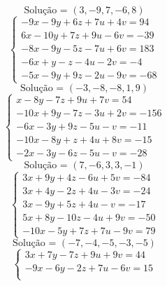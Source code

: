 \documentclass[12pt,oneside,a4paper,fleqn]{article}
\begin{document}
\begin{multicols*}{2}
\begin{equation*}
\end{equation*}
\begin{equation*}
\text{Solução = }\left(3,-9,7,-6,8\right)
\end{equation*}
\vspace{\baselineskip}
\begin{equation*}
\begin{cases}
-9x-9y+6z+7u+4v=94 \\
6x-10y+7z+9u-6v=-39 \\
-8x-9y-5z-7u+6v=183 \\
-6x+y-z-4u-2v=-4 \\
-5x-9y+9z-2u-9v=-68
\end{cases}
\end{equation*}
\begin{equation*}
\text{Solução = }\left(-3,-8,-8,1,9\right)
\end{equation*}
\vspace{\baselineskip}
\begin{equation*}
\begin{cases}
x-8y-7z+9u+7v=54 \\
-10x+9y-7z-3u+2v=-156 \\
-6x-3y+9z-5u-v=-11 \\
-10x-8y+z+4u+8v=-15 \\
-2x-3y-6z-5u-v=-28
\end{cases}
\end{equation*}
\begin{equation*}
\text{Solução = }\left(7,-6,3,3,-1\right)
\end{equation*}
\vspace{\baselineskip}
\begin{equation*}
\begin{cases}
3x+9y+4z-6u+5v=-84 \\
3x+4y-2z+4u-3v=-24 \\
3x-9y+5z+4u-v=-17 \\
5x+8y-10z-4u+9v=-50 \\
-10x-5y+7z+7u-9v=79
\end{cases}
\end{equation*}
\begin{equation*}
\text{Solução = }\left(-7,-4,-5,-3,-5\right)
\end{equation*}
\vspace{\baselineskip}
\begin{equation*}
\begin{cases}
3x+7y-7z+9u+9v=44 \\
-9x-6y-2z+7u-6v=15 \\

\end{cases}
\end{equation*}
\end{multicols*}
\end{document}
